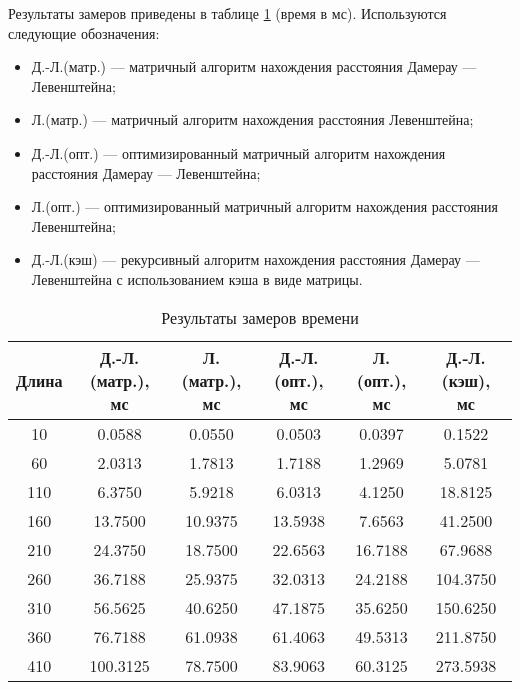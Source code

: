 Результаты замеров приведены в таблице \ref{tbl:time_mes} (время в мс). Используются следующие обозначения:
\begin{itemize}[label=---]
	\item Д.-Л.(матр.) --- матричный алгоритм нахождения расстояния Дамерау --- Левенштейна;
	\item Л.(матр.) --- матричный алгоритм нахождения расстояния Левенштейна;
	\item Д.-Л.(опт.) --- оптимизированный матричный алгоритм нахождения расстояния Дамерау --- Левенштейна;
	\item Л.(опт.) --- оптимизированный матричный алгоритм нахождения расстояния Левенштейна;
	\item Д.-Л.(кэш) --- рекурсивный алгоритм нахождения расстояния Дамерау --- Левенштейна с использованием кэша в виде матрицы.
\end{itemize}

\begin{table}[H]
	\begin{center}
			\captionsetup{justification=raggedright, singlelinecheck=off}
			\caption{Результаты замеров времени}
			\label{tbl:time_mes}
			\begin{tabular}{|c|c|c|c|c|c|}
				\hline
				Длина & \thead{Д.-Л.(матр.),\\мс} & \thead{Л.(матр.),\\мс} & \thead{Д.-Л.(опт.),\\мс} & \thead{Л.(опт.),\\мс} & \thead{Д.-Л.(кэш),\\мс}\\
				\hline
				10 & 0.0588 & 0.0550 & 0.0503 & 0.0397 & 0.1522 \\ 
				\hline
				60 & 2.0313 & 1.7813 & 1.7188 & 1.2969 & 5.0781 \\ 
				\hline
				110 & 6.3750 & 5.9218 & 6.0313 & 4.1250 & 18.8125 \\ 
				\hline
				160 & 13.7500 & 10.9375 & 13.5938 & 7.6563 & 41.2500 \\ 
				\hline
				210 & 24.3750 & 18.7500 & 22.6563 & 16.7188 & 67.9688 \\ 
				\hline
				260 & 36.7188 & 25.9375 & 32.0313 & 24.2188 & 104.3750 \\ 
				\hline
				310 & 56.5625 & 40.6250 & 47.1875 & 35.6250 & 150.6250 \\ 
				\hline
				360 & 76.7188 & 61.0938 & 61.4063 & 49.5313 & 211.8750 \\ 
				\hline
				410 & 100.3125 & 78.7500 & 83.9063 & 60.3125 & 273.5938 \\ 
				\hline			
			\end{tabular}
	\end{center}
\end{table}

